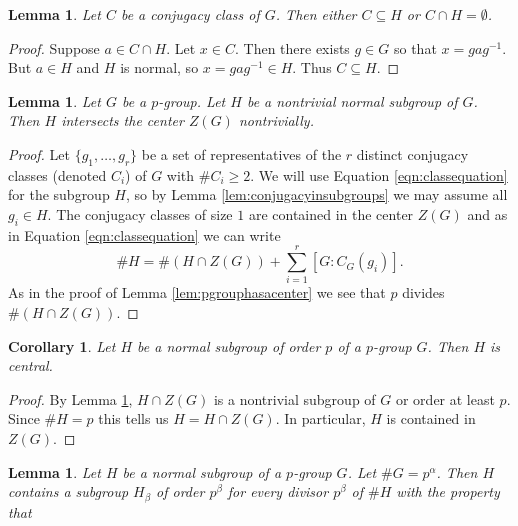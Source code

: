 \documentclass{dcthesis}
\numberwithin{equation}{section}
\newtheorem{lemma}[equation]{Lemma}
\newtheorem{corr}[equation]{Corollary}
\theoremstyle{definition}
\theoremstyle{remark}
\begin{document}
{{\begin{lemma}
      Let $C$ be a conjugacy class of $G$.
      Then either $C\subseteq H$ or $C\cap H = \emptyset$.
    \end{lemma}
    \begin{proof}
      Suppose $a\in C\cap H$.
      Let $x\in C$.
      Then there exists $g\in G$ so that
      $x = gag^{-1}$.
      But $a\in H$ and $H$ is normal,
      so $x=gag^{-1}\in H$.
      Thus $C\subseteq H$.
    \end{proof}
    \begin{lemma}
      \label{lem:normalimpliescentralintersect}
      Let $G$ be a $p$-group.
      Let $H$ be a nontrivial normal subgroup of $G$.
      Then $H$ intersects the center $Z(G)$ nontrivially.
    \end{lemma}
    \begin{proof}
      Let $\{g_1,\dots,g_r\}$ be a set of representatives of the
      $r$ distinct conjugacy classes (denoted $C_i$)
      of $G$ with $\#C_i\ge 2$.
      We will use Equation \ref{eqn:classequation}
      for the subgroup $H$, so
      by Lemma \ref{lem:conjugacyinsubgroups}
      we may assume all $g_i\in H$.
      The conjugacy classes of size $1$ are contained in the center $Z(G)$
      and as in Equation \ref{eqn:classequation} we
      can write
      \begin{equation}
        \label{eqn:classequationsubgroup}
        \#H = \#(H\cap Z(G))+
        \sum_{i=1}^r[G:C_G(g_i)].
      \end{equation}
      As in the proof of
      Lemma \ref{lem:pgrouphasacenter}
      we see that $p$ divides $\#(H\cap Z(G))$.
    \end{proof}
    \begin{corr}
      \label{cor:normalcentral}
      Let $H$ be a normal subgroup of order $p$ of a $p$-group $G$.
      Then $H$ is central.
    \end{corr}
    \begin{proof}
      By Lemma \ref{lem:normalimpliescentralintersect},
      $H\cap Z(G)$ is a nontrivial subgroup of $G$
      or order at least $p$.
      Since $\#H=p$ this tells us
      $H=H\cap Z(G)$.
      In particular,
      $H$ is contained in $Z(G)$.
    \end{proof}
    \begin{lemma}
      \label{lem:normalsubgroupsofallorders}
      Let $H$ be a normal subgroup of a $p$-group $G$.
      Let $\#G=p^\alpha$.
      Then $H$ contains a subgroup $H_\beta$ of order $p^\beta$
      for every divisor $p^\beta$ of $\#H$
      with the property that

\end{lemma}}}
\end{document}
